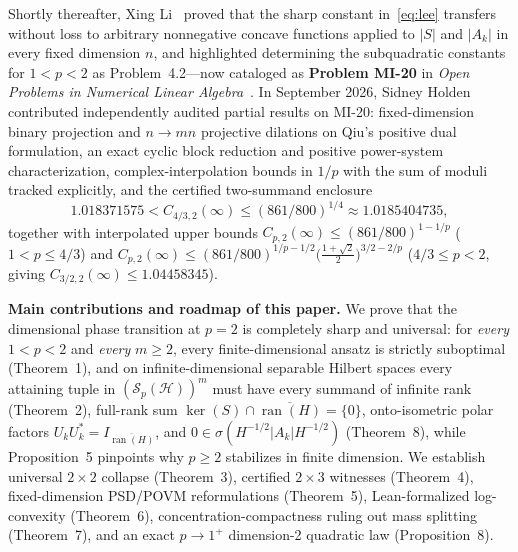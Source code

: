 \documentclass[10pt,letterpaper]{article}
\newcommand{\Hilb}{\mathcal{H}}
\newcommand{\Sp}{\mathcal{S}_p}
\newcommand{\ran}{\operatorname{ran}}
\begin{document}
Shortly thereafter, Xing Li~\cite{Li2026} proved that the sharp constant in~\eqref{eq:lee} transfers without loss to arbitrary nonnegative concave functions applied to $|S|$ and $|A_k|$ in every fixed dimension $n$, and highlighted determining the subquadratic constants for $1 < p < 2$ as Problem~4.2—now cataloged as \textbf{Problem MI-20} in \emph{Open Problems in Numerical Linear Algebra}~\cite{OpenProblemsNLA}. In September 2026, Sidney Holden~\cite{Holden2026a,Holden2026b} contributed independently audited partial results on MI-20: fixed-dimension binary projection and $n \to mn$ projective dilations on Qiu's positive dual formulation, an exact cyclic block reduction and positive power-system characterization, complex-interpolation bounds in $1/p$ with the sum of moduli tracked explicitly, and the certified two-summand enclosure
\[
  1.018371575 < C_{4/3,2}(\infty) \le (861/800)^{1/4} \approx 1.0185404735,
\]
together with interpolated upper bounds $C_{p,2}(\infty) \le (861/800)^{1-1/p}$ ($1 < p \le 4/3$) and $C_{p,2}(\infty) \le (861/800)^{1/p-1/2}\bigl(\frac{1+\sqrt{2}}{2}\bigr)^{3/2-2/p}$ ($4/3 \le p < 2$, giving $C_{3/2,2}(\infty) \le 1.04458345$).

\medskip
\textbf{Main contributions and roadmap of this paper.}
We prove that the dimensional phase transition at $p = 2$ is completely sharp and universal: for \emph{every} $1 < p < 2$ and \emph{every} $m \ge 2$, every finite-dimensional ansatz is strictly suboptimal (Theorem~1), and on infinite-dimensional separable Hilbert spaces every attaining tuple in $(\Sp(\Hilb))^m$ must have every summand of infinite rank (Theorem~2), full-rank sum $\ker(S) \cap \overline{\ran(H)} = \{0\}$, onto-isometric polar factors $U_k U_k^* = I_{\overline{\ran(H)}}$, and $0 \in \sigma(H^{-1/2}|A_k|H^{-1/2})$ (Theorem~8), while Proposition~5 pinpoints why $p \ge 2$ stabilizes in finite dimension. We establish universal $2\times 2$ collapse (Theorem~3), certified $2\times 3$ witnesses (Theorem~4), fixed-dimension PSD/POVM reformulations (Theorem~5), Lean-formalized log-convexity (Theorem~6), concentration-compactness ruling out mass splitting (Theorem~7), and an exact $p \to 1^+$ dimension-2 quadratic law (Proposition~8).
\end{document}

